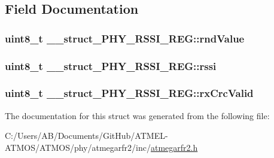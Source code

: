 \subsection{Field Documentation}
\hypertarget{struct____struct___p_h_y___r_s_s_i___r_e_g_a4d0c9956849721064feee1fb8a764f0e}{
\subsubsection[{rnd\-Value}]{\setlength{\rightskip}{0pt plus 5cm}uint8\-\_\-t \-\_\-\-\_\-struct\-\_\-\-P\-H\-Y\-\_\-\-R\-S\-S\-I\-\_\-\-R\-E\-G\-::rnd\-Value}}\label{struct____struct___p_h_y___r_s_s_i___r_e_g_a4d0c9956849721064feee1fb8a764f0e}
\hypertarget{struct____struct___p_h_y___r_s_s_i___r_e_g_a870b6484678eab14277119ac70f3e871}{
\subsubsection[{rssi}]{\setlength{\rightskip}{0pt plus 5cm}uint8\-\_\-t \-\_\-\-\_\-struct\-\_\-\-P\-H\-Y\-\_\-\-R\-S\-S\-I\-\_\-\-R\-E\-G\-::rssi}}\label{struct____struct___p_h_y___r_s_s_i___r_e_g_a870b6484678eab14277119ac70f3e871}
\hypertarget{struct____struct___p_h_y___r_s_s_i___r_e_g_ae05cd0b7590fbc76665d35a46ae0b955}{
\subsubsection[{rx\-Crc\-Valid}]{\setlength{\rightskip}{0pt plus 5cm}uint8\-\_\-t \-\_\-\-\_\-struct\-\_\-\-P\-H\-Y\-\_\-\-R\-S\-S\-I\-\_\-\-R\-E\-G\-::rx\-Crc\-Valid}}\label{struct____struct___p_h_y___r_s_s_i___r_e_g_ae05cd0b7590fbc76665d35a46ae0b955}


The documentation for this struct was generated from the following file\-:\begin{DoxyCompactItemize}
\item 
C\-:/\-Users/\-A\-B/\-Documents/\-Git\-Hub/\-A\-T\-M\-E\-L-\/\-A\-T\-M\-O\-S/\-A\-T\-M\-O\-S/phy/atmegarfr2/inc/\hyperlink{atmegarfr2_8h}{atmegarfr2.\-h}\end{DoxyCompactItemize}
